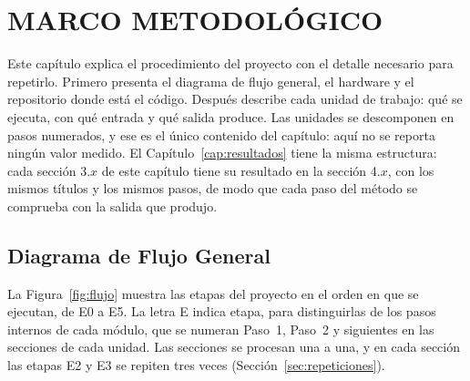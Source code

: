 \chapter{MARCO METODOLÓGICO}
\label{cap:metodo}

Este capítulo explica el procedimiento del proyecto con el detalle necesario
para repetirlo. Primero presenta el diagrama de flujo general, el hardware y el
repositorio donde está el código. Después describe cada unidad de trabajo: qué
se ejecuta, con qué entrada y qué salida produce. Las unidades se descomponen en
pasos numerados, y ese es el único contenido del capítulo: aquí no se reporta
ningún valor medido. El Capítulo~\ref{cap:resultados} tiene la misma estructura:
cada sección 3.$x$ de este capítulo tiene su resultado en la sección 4.$x$, con
los mismos títulos y los mismos pasos, de modo que cada paso del método se
comprueba con la salida que produjo.

\FloatBarrier
\section{Diagrama de Flujo General}
\label{sec:diagrama-flujo}

La Figura~\ref{fig:flujo} muestra las etapas del proyecto en el orden en que se
ejecutan, de E0 a E5. La letra E indica etapa, para distinguirlas de los pasos
internos de cada módulo, que se numeran Paso~1, Paso~2 y siguientes en las
secciones de cada unidad. Las secciones se procesan una a una, y en cada sección
las etapas E2 y E3 se repiten tres veces (Sección~\ref{sec:repeticiones}).

